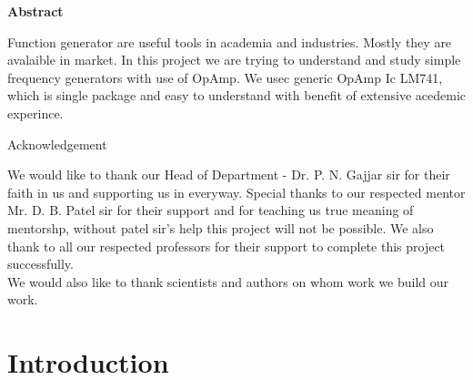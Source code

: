 \documentclass[14pt,a4paper]{extarticle}
\begin{document}
\vspace*{\fill}
\begin{center}
\colorbox{bg1}{ \begin{minipage}{.95\textwidth}\centering \vspace{1.5cm} \Large \textbf{Abstract}\\
\begin{minipage}{0.8\textwidth} \vspace{.8cm} \normalsize Function generator are useful tools in academia and industries. Mostly they are avalaible in market. In this project we are trying to understand and study simple frequency generators with use of OpAmp. We usec generic OpAmp Ic LM741, which is single package and easy to understand with benefit of extensive acedemic experince. \vspace{1.5cm} \end{minipage}
\end{minipage}}
\end{center}
\vspace*{\fill}
\pagebreak

\vspace*{\fill}
\begin{center}
\begin{huge}
Acknowledgement\\
\end{huge}
\end{center}
\vspace{2cm}
\begin{large}

We would like to thank our Head of Department
- Dr. P. N. Gajjar sir for their faith in us and
supporting us in everyway. Special thanks to our
respected mentor Mr. D. B. Patel sir for their support and for teaching us true meaning of mentorshp, without patel sir's help this project will not be possible. We also thank to all our respected professors
for their support to complete this project successfully.\\
We would also like to thank scientists and authors on
whom work we build our work.\\
\end{large}

\vspace*{\fill}
\pagebreak


\renewcommand*\contentsname{Table Of Contents}
\tableofcontents
\pagebreak
{} 
\setcounter{page}{1}
\section{Introduction}
\label{sec:orgf26165a}
\end{document}
